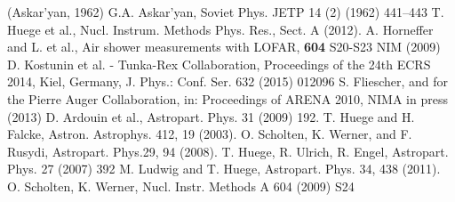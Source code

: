\begin{thebibliography}{1}
 (Askar’yan, 1962) G.A. Askar’yan, Soviet Phys. JETP 14 (2) (1962) 441–443
 T. Huege et al., Nucl. Instrum. Methods Phys. Res., Sect.
A (2012).
 A. Horneffer and L. et al., Air shower measurements with LOFAR, \textbf{604} S20-S23 NIM (2009)
 D. Kostunin et al. - Tunka-Rex Collaboration, Proceedings of the 24th ECRS 2014, Kiel, Germany, J. Phys.: Conf. Ser. 632 (2015) 012096 
 S. Fliescher, and for the Pierre Auger Collaboration, in: Proceedings of ARENA 2010, NIMA in press (2013)
 D. Ardouin et al., Astropart. Phys. 31 (2009) 192.
 T. Huege and H. Falcke, Astron. Astrophys. 412, 19 (2003).
 O. Scholten, K. Werner, and F. Rusydi, Astropart. Phys.29, 94 (2008).
 T. Huege, R. Ulrich, R. Engel, Astropart. Phys. 27 (2007) 392
 M. Ludwig and T. Huege, Astropart. Phys. 34, 438 (2011).
 O. Scholten, K. Werner, Nucl. Instr. Methods A 604 (2009) S24
\end{thebibliography}